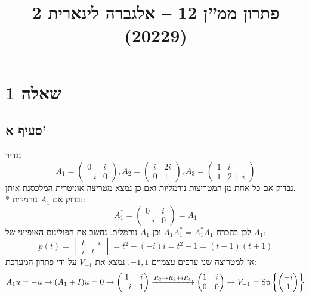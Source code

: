 

\title{פתרון ממ''ן 12 – אלגברה לינארית 2 (20229)}


\maketitle

\section{שאלה 1}
\subsection{סעיף א'}
נגדיר
\[
	A_1 = \begin{pmatrix}
		0 & i \\
		-i & 0
	\end{pmatrix},
	A_2 = \begin{pmatrix}
		i & 2i \\
		0 & 1
	\end{pmatrix},
	A_3 = \begin{pmatrix}
		1 & i \\
		1 & 2 + i
	\end{pmatrix}
\]
נבדוק אם כל אחת מן המטריצות נורמליות ואם כן נמצא מטריצה אוניטרית המלכסנת אותן. \\*
נבדוק אם $A_1$ נורמלית:
\[
	A_1^* = \begin{pmatrix}
		0 & i \\
		-i & 0
	\end{pmatrix} = A_1
\]
לכן בהכרח $A_1 A_1^* = A_1^* A_1$ וכן $A_1$ נורמלית.
נחשב את הפולינום האופייני של $A_1$:
\[
	p(t) = \begin{vmatrix}
		t & -i \\
		i & t
	\end{vmatrix}
	= t^2 - (-i)i = t^2 - 1 = (t - 1)(t + 1)
\]
אז למטריצה שני ערכים עצמיים $-1, 1$.
נמצא את $V_{-1}$ על־ידי פתרון המערכת:
\[
	A_1 u = -u \rightarrow (A_1 + I) u = 0 \rightarrow \begin{pmatrix}
		1 & i \\
		-i & 1
	\end{pmatrix}
	\xrightarrow{R_2 \to R_2 + iR_1}
	\begin{pmatrix}
		1 & i \\
		0 & 0
	\end{pmatrix}
	\rightarrow
	V_{-1} = \operatorname{Sp}\left\{ \begin{pmatrix} -i \\ 1 \end{pmatrix} \right\}
\]
